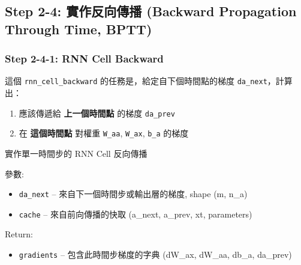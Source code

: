 \documentclass[11pt]{article}
\providecommand{\tightlist}{%
      \setlength{\itemsep}{0pt}\setlength{\parskip}{0pt}}
\begin{document}
    \subsection{Step 2-4: 實作反向傳播 (Backward Propagation Through Time,
BPTT)}\label{step-2-4-ux5be6ux4f5cux53cdux5411ux50b3ux64ad-backward-propagation-through-time-bptt}

    \subsubsection{Step 2-4-1: RNN Cell
Backward}\label{step-2-4-1-rnn-cell-backward}

    這個 \texttt{rnn\_cell\_backward} 的任務是，給定自下個時間點的梯度
\texttt{da\_next}，計算出：

\begin{enumerate}
\def\labelenumi{\arabic{enumi}.}
\tightlist
\item
  應該傳遞給 \textbf{上一個時間點} 的梯度 \texttt{da\_prev}
\item
  在 \textbf{這個時間點} 對權重 \texttt{W\_aa}, \texttt{W\_ax},
  \texttt{b\_a} 的梯度
\end{enumerate}

實作單一時間步的 RNN Cell 反向傳播

參數:

\begin{itemize}
\tightlist
\item
  \texttt{da\_next} -- 來自下一個時間步或輸出層的梯度, shape (m, n\_a)
\item
  \texttt{cache} -- 來自前向傳播的快取 (a\_next, a\_prev, xt,
  parameters)
\end{itemize}

Return:

\begin{itemize}
\tightlist
\item
  \texttt{gradients} -- 包含此時間步梯度的字典 (dW\_ax, dW\_aa, db\_a,
  da\_prev)
\end{itemize}
\end{document}
